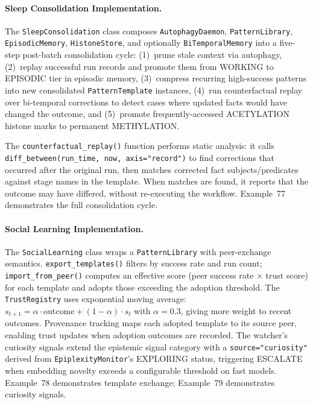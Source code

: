 \paragraph{Sleep Consolidation Implementation.}
\label{sec:consolidation-impl}
The \texttt{SleepConsolidation} class composes \texttt{AutophagyDaemon}, \texttt{PatternLibrary}, \texttt{EpisodicMemory}, \texttt{HistoneStore}, and optionally \texttt{BiTemporalMemory} into a five-step post-batch consolidation cycle: (1)~prune stale context via autophagy, (2)~replay successful run records and promote them from WORKING to EPISODIC tier in episodic memory, (3)~compress recurring high-success patterns into new consolidated \texttt{PatternTemplate} instances, (4)~run counterfactual replay over bi-temporal corrections to detect cases where updated facts would have changed the outcome, and (5)~promote frequently-accessed ACETYLATION histone marks to permanent METHYLATION.

The \texttt{counterfactual\_replay()} function performs static analysis: it calls \texttt{diff\_between(run\_time, now, axis="record")} to find corrections that occurred after the original run, then matches corrected fact subjects/predicates against stage names in the template. When matches are found, it reports that the outcome may have differed, without re-executing the workflow. Example~77 demonstrates the full consolidation cycle.

\paragraph{Social Learning Implementation.}
\label{sec:social-learning-impl}
The \texttt{SocialLearning} class wraps a \texttt{PatternLibrary} with peer-exchange semantics. \texttt{export\_templates()} filters by success rate and run count; \texttt{import\_from\_peer()} computes an effective score (peer success rate $\times$ trust score) for each template and adopts those exceeding the adoption threshold. The \texttt{TrustRegistry} uses exponential moving average: $s_{t+1} = \alpha \cdot \text{outcome} + (1-\alpha) \cdot s_t$ with $\alpha=0.3$, giving more weight to recent outcomes. Provenance tracking maps each adopted template to its source peer, enabling trust updates when adoption outcomes are recorded. The watcher's curiosity signals extend the epistemic signal category with a \texttt{source="curiosity"} derived from \texttt{EpiplexityMonitor}'s EXPLORING status, triggering ESCALATE when embedding novelty exceeds a configurable threshold on fast models. Example~78 demonstrates template exchange; Example~79 demonstrates curiosity signals.

